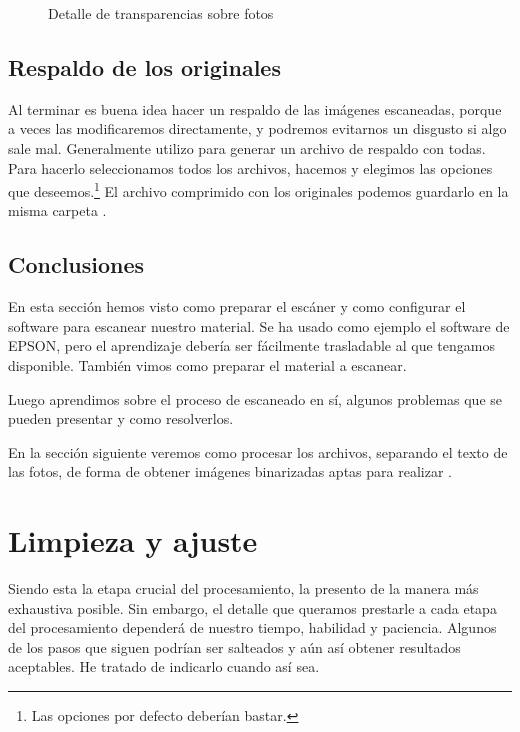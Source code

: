 \documentclass[%
	a5paper,
	10pt,
	twoside,
	openright,
	final,
]{memoir}
\begin{document}
{	\begin{figure}
		\par\medskip
		\par\medskip
		\caption{Detalle de transparencias sobre fotos\label{fig:transparency}}
	\end{figure}

	\section{Respaldo de los originales\label{sec:scanOriginalBackup}} Al terminar es buena idea hacer un respaldo de las imágenes escaneadas, porque a veces las modificaremos directamente, y podremos evitarnos un disgusto si algo sale mal. Generalmente utilizo \szip para generar un archivo de respaldo con todas. Para hacerlo seleccionamos todos los archivos, hacemos  y elegimos las opciones que deseemos.\footnote{Las opciones por defecto deberían bastar.} El archivo comprimido con los originales podemos guardarlo en la misma carpeta .

	\section{Conclusiones} En esta sección hemos visto como preparar el escáner y como configurar el software para escanear nuestro material. Se ha usado como ejemplo el software de EPSON, pero el aprendizaje debería ser fácilmente trasladable al que tengamos disponible. También vimos como preparar el material a escanear.

	Luego aprendimos sobre el proceso de escaneado en sí, algunos problemas que se pueden presentar y como resolverlos.

	En la sección siguiente veremos como procesar los archivos, separando el texto de las fotos, de forma de obtener imágenes binarizadas aptas para realizar \ocr.

	\chapter{Limpieza y ajuste\label{sec:cleanAdjust}} Siendo esta la etapa crucial del procesamiento, la presento de la manera más exhaustiva posible. Sin embargo, el detalle que queramos prestarle a cada etapa del procesamiento dependerá de nuestro tiempo, habilidad y paciencia. Algunos de los pasos que siguen podrían ser salteados y aún así obtener resultados aceptables. He tratado de indicarlo cuando así sea.

}
\end{document}
